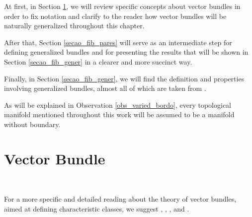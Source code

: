 \documentclass[12pt,oneside]{book}
\begin{document}
    At first, in Section \ref{secao_fib_vet}, we will review specific concepts about vector bundles in 
    order to fix notation and clarify to the reader how vector bundles will be naturally generalized 
    throughout this chapter.

    After that, Section \ref{secao_fib_pares} will serve as an intermediate step for defining generalized 
    bundles and for presenting the results that will be shown in Section \ref{secao_fib_gener} in a 
    clearer and more succinct way.

    Finally, in Section \ref{secao_fib_gener}, we will find the definition and properties involving 
    generalized bundles, almost all of which are taken from \cite{fadell_1}.

    As will be explained in Observation \ref{obs_varied_bordo}, every topological manifold mentioned 
    throughout this work will be assumed to be a manifold without boundary.



    \section{Vector Bundle}\label{secao_fib_vet}

    \

    For a more specific and detailed reading about the theory of vector bundles, aimed at defining characteristic classes, we suggest 
    \cite{alex}, \cite{hatcher_2}, \cite{husemoller}, and \cite{milnor_1}.
\end{document}
